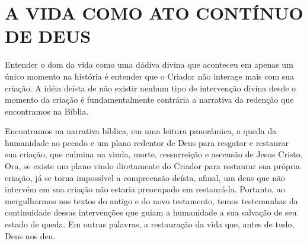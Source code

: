 \documentclass[
    article,            %
	12pt,				%
	oneside,			%
	a4paper,			%
	chapter=TITLE,		%
	section=TITLE,		%
	english,			%
	french,				%
	spanish,			%
	brazil				%
	]{abntex2}
\begin{document}



\imprimircapa

\imprimirfolhaderosto


\textual
\pagestyle{simple}


\section*{A VIDA COMO ATO CONTÍNUO DE DEUS}

Entender o dom da vida como uma dádiva divina que aconteceu em apenas um único momento na história é entender que o Criador não interage mais com sua criação. A idéia deísta de não existir nenhum tipo de intervenção divina desde o momento da criação é fundamentalmente contrária a narrativa da redenção que encontramos na Bíblia.

Encontramos na narrativa bíblica, em uma leitura panorâmica, a queda da humanidade ao pecado e um plano redentor de Deus para resgatar e restaurar sua criação, que culmina na vinda, morte, ressurreição e ascensão de Jesus Cristo. Ora, se existe um plano vindo diretamente do Criador para restaurar sua própria criação, já se torna impossível a compreensão deísta, afinal, um deus que não intervém em sua criação não estaria preocupado em restaurá-la. Portanto, ao mergulharmos nos textos do antigo e do novo testamento, temos testemunhas da continuidade dessas intervenções que guiam a humanidade a sua salvação de seu estado de queda. Em outras palavras, a restauração da vida que, antes de tudo, Deus nos deu.
\end{document}
